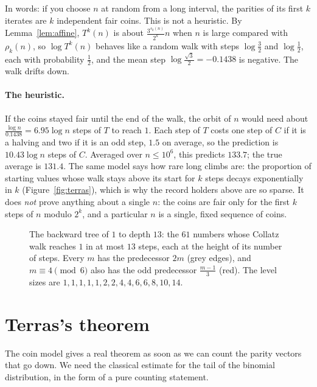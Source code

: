In words: if you choose $n$ at random from a long interval, the parities of its first $k$ iterates are $k$ independent fair coins. This is not a
heuristic. By Lemma~\ref{lem:affine}, $T^k(n)$ is about $\frac{3^{s_k(n)}}{2^k}n$ when $n$ is large compared with $\rho_k(n)$, so $\log T^k(n)$ behaves
like a random walk with steps $\log\frac32$ and $\log\frac12$, each with probability $\frac12$, and the mean step $\log\frac{\sqrt3}2=-0.1438$ is
negative. The walk drifts down.

\paragraph{The heuristic.} If the coins stayed fair until the end of the walk, the orbit of $n$ would need about $\frac{\log n}{0.1438}=6.95\log n$
steps of $T$ to reach $1$. Each step of $T$ costs one step of $C$ if it is a halving and two if it is an odd step, $1.5$ on average, so the prediction is
$10.43\log n$ steps of $C$. Averaged over $n\le10^6$, this predicts $133.7$; the true average is $131.4$. The same model says how rare long climbs are: the
proportion of starting values whose walk stays above its start for $k$ steps decays exponentially in $k$ (Figure~\ref{fig:terras}), which is why the
record holders above are so sparse. It does \emph{not} prove anything about a single $n$: the coins
are fair only for the first $k$ steps of $n$ modulo $2^k$, and a particular $n$ is a single, fixed sequence of coins.

\begin{figure}[ht]
\centering
{}
\caption{The backward tree of $1$ to depth $13$: the $61$ numbers whose Collatz walk reaches $1$ in at most $13$ steps, each at the height of its number
of steps. Every $m$ has the predecessor $2m$ (grey edges), and $m\equiv4\pmod6$ also has the odd predecessor $\frac{m-1}3$ (red). The level sizes are
$1,1,1,1,1,2,2,4,4,6,6,8,10,14$.}
\label{fig:tree}
\end{figure}

\section{Terras's theorem}

The coin model gives a real theorem as soon as we can count the parity vectors that go down. We need the classical estimate for the tail of the binomial
distribution, in the form of a pure counting statement.

